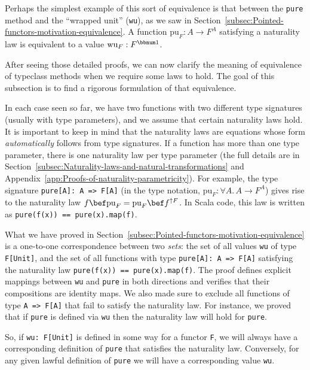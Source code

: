Perhaps the simplest example of this sort of equivalence is that between
the \lstinline!pure! method and the \textsf{``}wrapped unit\textsf{''} (\lstinline!wu!),
as we saw in Section~\ref{subsec:Pointed-functors-motivation-equivalence}.
A function $\text{pu}_{F}:A\rightarrow F^{A}$ satisfying a naturality
law is equivalent to a value $\text{wu}_{F}:F^{\bbnum 1}$. 

After seeing those detailed proofs, we can now clarify the meaning
of equivalence of typeclass methods when we require some laws to hold.
The goal of this subsection is to find a rigorous formulation of that
equivalence.

In each case seen so far, we have two functions with two different
type signatures (usually with type parameters), and we assume that
certain naturality laws hold. It is important to keep in mind that
the naturality laws are equations whose form \emph{automatically}
follows from type signatures. If a function has more than one type
parameter, there is one naturality law per type parameter (the full
details are in Section~\ref{subsec:Naturality-laws-and-natural-transformations}
and Appendix~\ref{app:Proofs-of-naturality-parametricity}). For
example, the type signature \lstinline!pure[A]: A => F[A]! (in the
type notation, $\text{pu}_{F}:\forall A.\,A\rightarrow F^{A}$) gives
rise to the naturality law $f\bef\text{pu}_{F}=\text{pu}_{F}\bef f^{\uparrow F}$.
In Scala code, this law is written as \lstinline!pure(f(x)) == pure(x).map(f)!.

What we have proved in Section~\ref{subsec:Pointed-functors-motivation-equivalence}
is a one-to-one correspondence between two \emph{sets}: the set of
all values \lstinline!wu! of type \lstinline!F[Unit]!, and the set
of all functions with type \lstinline!pure[A]: A => F[A]! satisfying
the naturality law \lstinline!pure(f(x)) == pure(x).map(f)!. The
proof defines explicit mappings between \lstinline!wu! and \lstinline!pure!
in both directions and verifies that their compositions are identity
maps. We also made sure to exclude all functions of type \lstinline!A => F[A]!
that fail to satisfy the naturality law. For instance, we proved that
if \lstinline!pure! is defined via \lstinline!wu! then the naturality
law will hold for \lstinline!pure!.

So, if \lstinline!wu: F[Unit]! is defined in some way for a functor
\lstinline!F!, we will always have a corresponding definition of
\lstinline!pure! that satisfies the naturality law. Conversely, for
any given lawful definition of \lstinline!pure! we will have a corresponding
value \lstinline!wu!.

